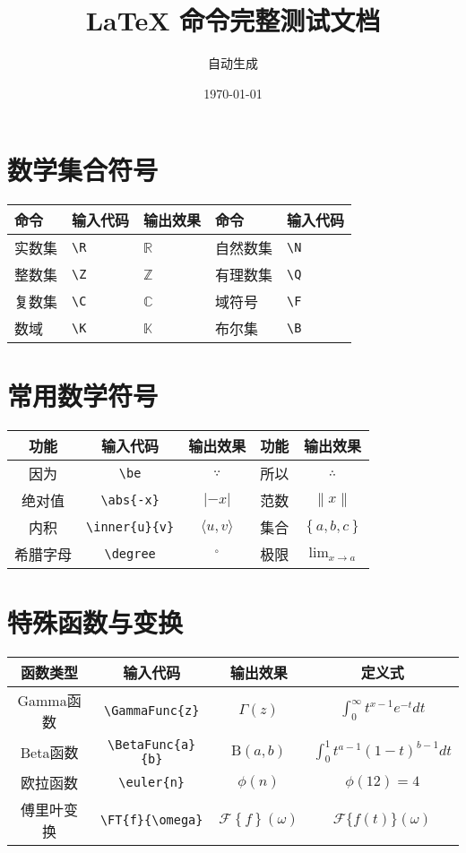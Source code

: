 \documentclass[12pt,a4paper]{ctexart}
\providecommand{\R}{\ensuremath{\mathbb{R}}} %
\providecommand{\N}{\ensuremath{\mathbb{N}}} %
\providecommand{\Z}{\ensuremath{\mathbb{Z}}} %
\providecommand{\Q}{\ensuremath{\mathbb{Q}}} %
\providecommand{\C}{\ensuremath{\mathbb{C}}} %
\providecommand{\F}{\ensuremath{\mathbb{F}}} %
\providecommand{\K}{\ensuremath{\mathbb{K}}} %
\providecommand{\B}{\ensuremath{\mathbb{B}}}
\newcommand{\be}{\ensuremath{\;\because\;}}  %
\newcommand{\so}{\ensuremath{\;\therefore\;}} %
\newcommand{\GammaFunc}[1]{\Gamma(#1)}       %
\newcommand{\GammaDef}{\int_0^\infty t^{x-1}e^{-t}dt}  %
\newcommand{\BetaFunc}[2]{\mathrm{B}(#1,#2)}  %
\newcommand{\BetaDef}{\int_0^1 t^{a-1}(1-t)^{b-1}dt}  %
\newcommand{\euler}[1]{\phi\left( #1 \right)}  %
\newcommand{\abs}[1]{\left| #1 \right|} %
\newcommand{\norm}[1]{\left\| #1 \right\|} %
\newcommand{\inner}[2]{\langle #1, #2 \rangle} %
\newcommand{\set}[1]{\left\{ #1 \right\}} %
\newcommand{\degree}{^\circ} %
\newcommand{\limit}[2]{\lim_{#1 \to #2}} %
\newcommand{\FT}[2]{\mathcal{F}\left\{#1\right\}(#2)}
\begin{document}
	
	\title{LaTeX 命令完整测试文档}
	\author{自动生成}
	\date{\today}
	\maketitle
	
	\section{数学集合符号}
	\begin{tabular}{|l|l|l|l|l|}
		\hline
		\textbf{命令} & \textbf{输入代码} & \textbf{输出效果} & \textbf{命令} & \textbf{输入代码} \\
		\hline
		实数集 & \verb|\R| & $\R$ & 自然数集 & \verb|\N| \\
		\hline
		整数集 & \verb|\Z| & $\Z$ & 有理数集 & \verb|\Q| \\
		\hline
		复数集 & \verb|\C| & $\C$ & 域符号 & \verb|\F| \\
		\hline
		数域 & \verb|\K| & $\K$ & 布尔集 & \verb|\B| \\
		\hline
	\end{tabular}
	
	\section{常用数学符号}
	\begin{tabular}{|c|c|c|c|c|}
		\hline
		\textbf{功能} & \textbf{输入代码} & \textbf{输出效果} & \textbf{功能} & \textbf{输出效果} \\
		\hline
		因为 & \verb|\be| & $\be$ & 所以 & $\so$ \\
		\hline
		绝对值 & \verb|\abs{-x}| & $\abs{-x}$ & 范数 & $\norm{x}$ \\
		\hline
		内积 & \verb|\inner{u}{v}| & $\inner{u}{v}$ & 集合 & $\set{a,b,c}$ \\
		\hline
		希腊字母 & \verb|\degree| & $\degree$ & 极限 & $\limit{x}{a}$ \\
		\hline
	\end{tabular}
	
	\section{特殊函数与变换}
	\begin{tabular}{|c|c|c|c|}
		\hline
		\textbf{函数类型} & \textbf{输入代码} & \textbf{输出效果} & \textbf{定义式} \\
		\hline
		Gamma函数 & \verb|\GammaFunc{z}| & $\GammaFunc{z}$ & $\GammaDef$ \\
		\hline
		Beta函数 & \verb|\BetaFunc{a}{b}| & $\BetaFunc{a}{b}$ & $\BetaDef$ \\
		\hline
		欧拉函数 & \verb|\euler{n}| & $\euler{n}$ & $\phi(12)=4$ \\
		\hline
		傅里叶变换 & \verb|\FT{f}{\omega}| & $\FT{f}{\omega}$ & $\mathcal{F}\{f(t)\}(\omega)$ \\
		\hline
	\end{tabular}
	
\end{document}
